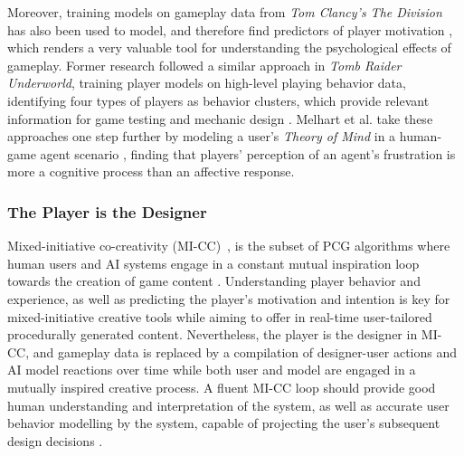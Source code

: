 Moreover, training models on gameplay data from \textit{Tom Clancy's The Division} has also been used to model, and therefore find predictors of player motivation , which renders a very valuable tool for understanding the psychological effects of gameplay. Former research followed a similar approach in \textit{Tomb Raider Underworld}, training player models on high-level playing behavior data, identifying four types of players as behavior clusters, which provide relevant information for game testing and mechanic design . Melhart et al. take these approaches one step further by modeling a user's \textit{Theory of Mind} in a human-game agent scenario , finding that players' perception of an agent's frustration is more a cognitive process than an affective response. %


\subsubsection{The Player is the Designer}

Mixed-initiative co-creativity (MI-CC)~, is the subset of PCG algorithms where human users and AI systems engage in a constant mutual inspiration loop towards the creation of game content . Understanding player behavior and experience, as well as predicting the player's motivation and intention is key for mixed-initiative creative tools while aiming to offer in real-time user-tailored procedurally generated content. Nevertheless, the player is the designer in MI-CC, and gameplay data is replaced by a compilation of designer-user actions and AI model reactions over time while both user and model are engaged in a mutually inspired creative process. A fluent MI-CC loop should provide good human understanding and interpretation of the system, as well as accurate user behavior modelling by the system, capable of projecting the user's subsequent design decisions . 

